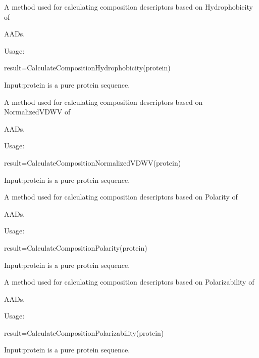 \documentclass[letterpaper,10pt,english]{sphinxmanual}
\begin{document}
\begin{fulllineitems}
\label{reference/CTD:CTD.CalculateCompositionHydrophobicity}
A method used for calculating composition descriptors based on Hydrophobicity of

AADs.

Usage:

result=CalculateCompositionHydrophobicity(protein)

Input:protein is a pure protein sequence.

\end{fulllineitems}


\begin{fulllineitems}
\label{reference/CTD:CTD.CalculateCompositionNormalizedVDWV}
A method used for calculating composition descriptors based on NormalizedVDWV of

AADs.

Usage:

result=CalculateCompositionNormalizedVDWV(protein)

Input:protein is a pure protein sequence.

\end{fulllineitems}


\begin{fulllineitems}
\label{reference/CTD:CTD.CalculateCompositionPolarity}
A method used for calculating composition descriptors based on Polarity of

AADs.

Usage:

result=CalculateCompositionPolarity(protein)

Input:protein is a pure protein sequence.

\end{fulllineitems}


\begin{fulllineitems}
\label{reference/CTD:CTD.CalculateCompositionPolarizability}
A method used for calculating composition descriptors based on Polarizability of

AADs.

Usage:

result=CalculateCompositionPolarizability(protein)

Input:protein is a pure protein sequence.

\end{fulllineitems}
\end{document}
